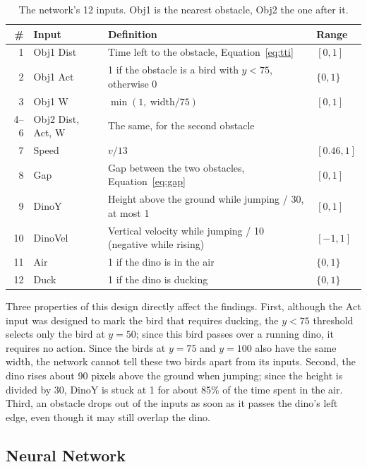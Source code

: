 \documentclass[11pt,a4paper]{article}
\begin{document}
\begin{table}[!htbp]
  \centering
  \small
  \caption{The network's 12 inputs. Obj1 is the nearest obstacle, Obj2 the one after it.}
  \label{tab:inputs}
  \begin{tabularx}{\linewidth}{@{}r l Y l@{}}
    \toprule
    \# & Input & Definition & Range \\
     & Obj1 Dist & Time left to the obstacle, Equation~\eqref{eq:tti} & $[0, 1]$ \\
    2 & Obj1 Act & 1 if the obstacle is a bird with $y < 75$, otherwise 0 & $\{0, 1\}$ \\
    3 & Obj1 W & $\min(1,\ \text{width}/75)$ & $[0, 1]$ \\
    4--6 & Obj2 Dist, Act, W & The same, for the second obstacle & \\
    7 & Speed & $v/13$ & $[0.46, 1]$ \\
    8 & Gap & Gap between the two obstacles, Equation~\eqref{eq:gap} & $[0, 1]$ \\
    9 & DinoY & Height above the ground while jumping / 30, at most 1 & $[0, 1]$ \\
    10 & DinoVel & Vertical velocity while jumping / 10 (negative while rising) & $[-1, 1]$ \\
    11 & Air & 1 if the dino is in the air & $\{0, 1\}$ \\
    12 & Duck & 1 if the dino is ducking & $\{0, 1\}$ \\
    \bottomrule
  \end{tabularx}
\end{table}
\FloatBarrier

Three properties of this design directly affect the findings. First, although the Act input was designed to mark the bird that requires ducking, the $y < 75$ threshold selects only the bird at ${y = 50}$; since this bird passes over a running dino, it requires no action. Since the birds at ${y = 75}$ and ${y = 100}$ also have the same width, the network cannot tell these two birds apart from its inputs. Second, the dino rises about 90 pixels above the ground when jumping; since the height is divided by 30, DinoY is stuck at 1 for about 85\% of the time spent in the air. Third, an obstacle drops out of the inputs as soon as it passes the dino's left edge, even though it may still overlap the dino.

\subsection{Neural Network}
\end{document}
